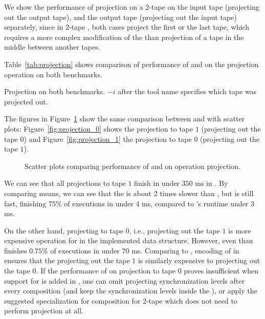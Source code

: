 We show the performance of projection on a $2$-tape \nfts on the input tape (projecting out the output tape), and the output tape (projecting out the input tape) separately, since in $2$-tape \nfts, both cases project the first or the last tape, which requires a more complex modification of the \nft than projection of a tape in the middle between another tapes.

Table~\ref{tab:projection} shows comparison of performance of \mata and \mona on the projection operation on both benchmarks.

\begin{table}[ht]
  \centering
  
  \caption{
    Projection on both benchmarks. $-i$ after the tool name specifies which tape was projected out.
  }
  \label{tab:projection}
\end{table}

The figures in Figure~\ref{fig:projection} show the same comparison between \mata and \mona with scatter plots: Figure~\ref{fig:projection_0} shows the projection to tape $1$ (projecting out the tape $0$) and Figure~\ref{fig:projection_1} the projection to tape $0$ (projecting out the tape $1$).

\begin{figure}[ht]
    \centering
    \quad
    \caption{
      Scatter plots comparing performance of \mata and \mona on operation projection.
    }
    \label{fig:projection}%
\end{figure}

We can see that all projections to tape $1$ finish in under $350$ ms in \mata.
By comparing means, we can see that the \mata is about 2 times slower than \mona, but is still fast, finishing $75\%$ of executions in under $4$ ms, compared to \mona's runtime under $3$ ms.

On the other hand, projecting to tape $0$, i.e., projecting out the tape $1$ is more expensive operation for \mata in the implemented data structure.
However, even than \mata finishes $0.75\%$ of executions in under $70$ ms.
Comparing to \mona, encoding of \nfts in \mona ensures that the projecting out the tape $1$ is similarly expensive to projecting out the tape $0$.
If the performance of \mata on projection to tape $0$ proves insufficient when support for \nfts is added in \noodler, one can omit projecting synchronization levels after every composition (and keep the synchronization levels inside the \nft), or apply the suggested specialization for composition for $2$-tape \nfts which does not need to perform projection at all.

